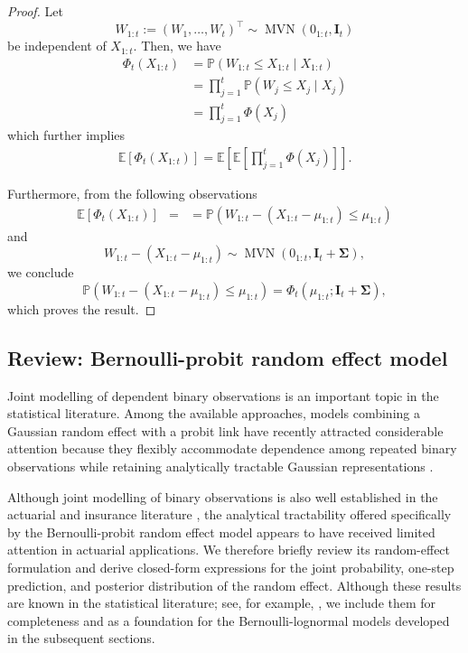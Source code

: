 \documentclass[11pt,authoryear]{elsarticle}
\def\P#1{{\mathbb{P}}\left(#1\right)}
\def\E#1{{\mathbb E}\left[#1\right]}
\theoremstyle{nopunct}
\numberwithin{equation}{section}
\begin{document}
\begin{proof}
Let
\[
W_{1:t}:=(W_1,\ldots,W_t)^\top
\sim
\operatorname{MVN}(0_{1:t},\boldsymbol I_t)
\]
be independent of \(X_{1:t}\). Then, we have
\[
\begin{aligned}
\Phi_{t}(X_{1:t})&=
\P{W_{1:t}\le X_{1:t}\mid X_{1:t}}\\
&=\prod_{j=1}^{t}\P{W_j\le X_j\mid X_j}\\
&=\prod_{j=1}^{t}\Phi(X_j)
\end{aligned}
\]
which further implies
\[
\begin{aligned}
\E{\Phi_{t}(X_{1:t})}=\E{\E{\prod_{j=1}^{t}\Phi(X_j)}}.
\end{aligned}
\]

Furthermore, from the following observations
\[
\begin{aligned}
\E{\Phi_{t}(X_{1:t})}&=
&=
\P{
W_{1:t}-(X_{1:t}-\mu_{1:t})
\le
\mu_{1:t}
}
\end{aligned}
\]
and
\[
W_{1:t}-(X_{1:t}-\mu_{1:t})
\sim
\operatorname{MVN}
\left(
0_{1:t},
\boldsymbol I_t+\boldsymbol\Sigma
\right),
\]
we conclude
\[
\P{
W_{1:t}-(X_{1:t}-\mu_{1:t})
\le
\mu_{1:t}
}
=
\Phi_t
\left(
\mu_{1:t};
\boldsymbol I_t+\boldsymbol\Sigma
\right),
\]
which proves the result.
\end{proof}


\subsection{Review: Bernoulli-probit random effect model}

Joint modelling of dependent binary observations is an important topic
in the statistical literature. Among the available approaches, models
combining a Gaussian random effect with a probit link have recently attracted
considerable attention because they flexibly accommodate dependence
among repeated binary observations while retaining analytically
tractable Gaussian representations
\citep{farewell2017two,durante2019conjugate,fasano2021closed,
cao2022scalable}.

Although joint modelling of binary observations is also well established
in the actuarial and insurance literature
\citep{young2009multivariate,frees2010dependent,guo2025entity,
oh2026matrix}, the analytical tractability offered specifically by the
Bernoulli-probit random effect model appears to have received limited
attention in actuarial applications. We therefore briefly review its
 random-effect formulation and derive closed-form expressions for
the joint probability, one-step prediction, and posterior distribution
of the random effect. Although these results are known in the statistical
literature; see, for example, \citet{farewell2017two}, we include them for
completeness and as a foundation for the Bernoulli-lognormal models
developed in the subsequent sections.
\end{document}
